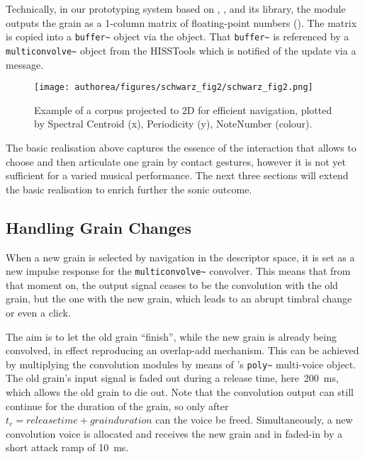 Technically, in our prototyping system based on , , and its   library, the  module outputs the grain as a 1-column matrix of floating-point numbers ().  The matrix is copied into a \verb|buffer~| object via the  object.
That \verb|buffer~| is referenced by a \verb|multiconvolve~| object from the HISSTools which is notified of the update via a message.

\begin{figure}[tbh]
\begin{center}
\texttt{[image: authorea/figures/schwarz\_fig2/schwarz\_fig2.png]}
\caption{Example of a corpus projected to 2D for efficient navigation, plotted by Spectral Centroid (x), Periodicity (y), NoteNumber (colour).}\label{fig:corpus}
\end{center}
\end{figure}

The basic realisation above captures the essence of the interaction that allows to choose and then articulate one grain by contact gestures, however it is not yet sufficient for a varied musical performance.  The next three sections will extend the basic realisation to enrich further the sonic outcome.


\subsection{Handling Grain Changes}\label{sec:set}

\begin{sloppypar}
When a new grain is selected by navigation in the descriptor space, it is set as a new impulse response for the \verb|multiconvolve~| convolver.  This means that from that moment on, the output signal ceases to be the convolution with the old grain, but the one with the new grain, which leads to an abrupt timbral change or even a click.
\end{sloppypar}

The aim is to let the old grain ``finish'', while the new grain is already being convolved, in effect reproducing an overlap-add mechanism.  This can be achieved by multiplying the convolution modules by means of \maxmsp's \verb|poly~| multi-voice object.  The old grain's input signal is faded out during a release time, here~200~ms, which allows the old grain to die out.  Note that the convolution output can still continue for the duration of the grain, so only after $t_r = release time + grain duration$ can the voice be freed.  Simultaneously, a new convolution voice is allocated and receives the new grain and in faded-in by a short attack ramp of 10~ms.

